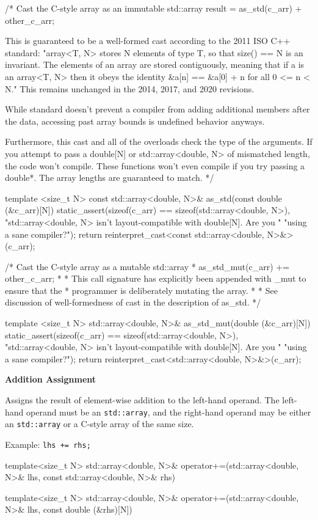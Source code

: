 \documentclass[11pt,fleqn]{report}
\begin{document}
\begin{code}
/* Cast the C-style array as an immutable std::array
result = as_std(c_arr) + other_c_arr;

This is guaranteed to be a well-formed cast according to the 2011 ISO C++
standard:
  "array<T, N> stores N elements of type T, so that size() == N is an
  invariant. The elements of an array are stored contiguously, meaning that
  if a is an array<T, N> then it obeys the identity &a[n] == &a[0] + n for
  all 0 <= n < N."
This remains unchanged in the 2014, 2017, and 2020 revisions.

While standard doesn't prevent a compiler from adding additional members
after the data, accessing past array bounds is undefined behavior anyways.

Furthermore, this cast and all of the overloads check the type of the
arguments. If you attempt to pass a double[N] or std::array<double, N> of
mismatched length, the code won't compile. These functions won't even compile
if you try passing a double*. The array lengths are guaranteed to match. */

template <size_t N>
const std::array<double, N>& as_std(const double (&c_arr)[N]) {
 static_assert(sizeof(c_arr) == sizeof(std::array<double, N>),
     "std::array<double, N> isn't layout-compatible with double[N]. Are you "
     "using a sane compiler?");
 return reinterpret_cast<const std::array<double, N>&>(c_arr);
}

/* Cast the C-style array as a mutable std::array
* as_std_mut(c_arr) += other_c_arr;
*
* This call signature has explicitly been appended with _mut to ensure that the
* programmer is deliberately mutating the array.
*
* See discussion of well-formedness of cast in the description of as_std. */

template <size_t N>
std::array<double, N>& as_std_mut(double (&c_arr)[N]) {
 static_assert(sizeof(c_arr) == sizeof(std::array<double, N>),
     "std::array<double, N> isn't layout-compatible with double[N]. Are you "
     "using a sane compiler?");
 return reinterpret_cast<std::array<double, N>&>(c_arr);
}
\end{code}

\textbf{Addition Assignment}

Assigns the result of element-wise addition to the left-hand operand.
The left-hand operand must be an \texttt{std::array}, and the right-hand 
operand may be either an \texttt{std::array} or a C-style array 
of the same size.

Example: \texttt{lhs += rhs;}
\begin{code}
template<size_t N>
std::array<double, N>& operator+=(std::array<double, N>& lhs, 
                                  const std::array<double, N>& rhs)

template<size_t N>
std::array<double, N>& operator+=(std::array<double, N>& lhs, 
                                  const double (&rhs)[N])
\end{code}
\end{document}
